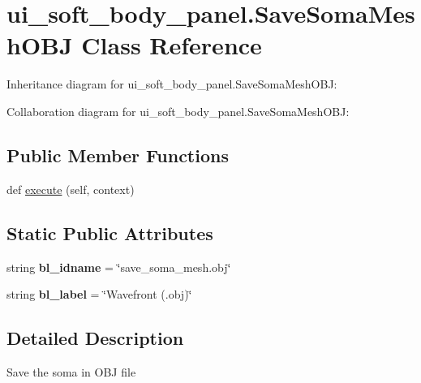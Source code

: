 \hypertarget{classui__soft__body__panel_1_1SaveSomaMeshOBJ}{}\section{ui\+\_\+soft\+\_\+body\+\_\+panel.\+Save\+Soma\+Mesh\+O\+BJ Class Reference}
\label{classui__soft__body__panel_1_1SaveSomaMeshOBJ}


Inheritance diagram for ui\+\_\+soft\+\_\+body\+\_\+panel.\+Save\+Soma\+Mesh\+O\+BJ\+:


Collaboration diagram for ui\+\_\+soft\+\_\+body\+\_\+panel.\+Save\+Soma\+Mesh\+O\+BJ\+:
\subsection*{Public Member Functions}
\begin{DoxyCompactItemize}
\item 
def \hyperlink{classui__soft__body__panel_1_1SaveSomaMeshOBJ_af1d769fbfb5b2cbdaca3168fb75d094e}{execute} (self, context)
\end{DoxyCompactItemize}
\subsection*{Static Public Attributes}
\begin{DoxyCompactItemize}
\item 
string {\bfseries bl\+\_\+idname} = \char`\"{}save\+\_\+soma\+\_\+mesh.\+obj\char`\"{}\hypertarget{classui__soft__body__panel_1_1SaveSomaMeshOBJ_a48bda4b2fef8c0f20dc5f9bed31b7d0b}{}\label{classui__soft__body__panel_1_1SaveSomaMeshOBJ_a48bda4b2fef8c0f20dc5f9bed31b7d0b}

\item 
string {\bfseries bl\+\_\+label} = \char`\"{}Wavefront (.obj)\char`\"{}\hypertarget{classui__soft__body__panel_1_1SaveSomaMeshOBJ_a4ac1f5bafe9abf7848d630043bac9e93}{}\label{classui__soft__body__panel_1_1SaveSomaMeshOBJ_a4ac1f5bafe9abf7848d630043bac9e93}

\end{DoxyCompactItemize}


\subsection{Detailed Description}
\begin{DoxyVerb}Save the soma in OBJ file\end{DoxyVerb}
 

